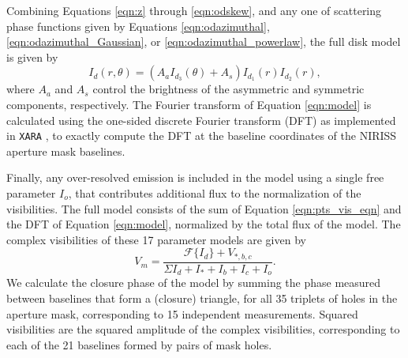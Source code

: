 \documentclass[11pt,twocolumn,twocolappendix]{aastex631}
\begin{document}
Combining Equations \ref{eqn:z}
through \ref{eqn:odskew}, and any one of scattering phase functions given by Equations \ref{eqn:odazimuthal}, \ref{eqn:odazimuthal_Gaussian}, or \ref{eqn:odazimuthal_powerlaw}, the full disk model is given by
\begin{equation}
\label{eqn:model}
    I_{d}(r,\theta) = \left(A_a I_{d_3}(\theta) + A_s \right)  I_{d_1}(r) I_{d_2}(r),
\end{equation}
where $A_a$ and $A_s$ control the brightness of the asymmetric and symmetric components, respectively. The Fourier transform of Equation \ref{eqn:model} is calculated using the one-sided discrete Fourier transform (DFT) as implemented in \texttt{XARA} \citep{2010ApJ...724..464M,2013PASP..125..422M,2020A&A...636A..72M}, to exactly compute the DFT at the baseline coordinates of the NIRISS aperture mask baselines.  

Finally, any over-resolved emission is included in the model using a single free parameter $I_o$, that contributes additional flux to the normalization of the visibilities. The full model consists of the sum of Equation \ref{eqn:pts_vis_eqn} and the DFT of Equation \ref{eqn:model}, normalized by the total flux of the model. The complex visibilities of {these 17 parameter models} are given by
\begin{equation}
\label{eqn:modelvis}
    V_{m} = \frac{\mathcal{F}\{I_{d}\} + V_{*,b,c}}{\Sigma I_{d} + I_* + I_b + I_c + I_o}.
\end{equation}
We calculate the closure phase of the model by summing the phase measured between baselines that form a (closure) triangle, for all 35 triplets of holes in the aperture mask, corresponding to 15 independent measurements. Squared visibilities are the squared amplitude of the complex visibilities, corresponding to each of the 21 baselines formed by pairs of mask holes. 
\end{document}
